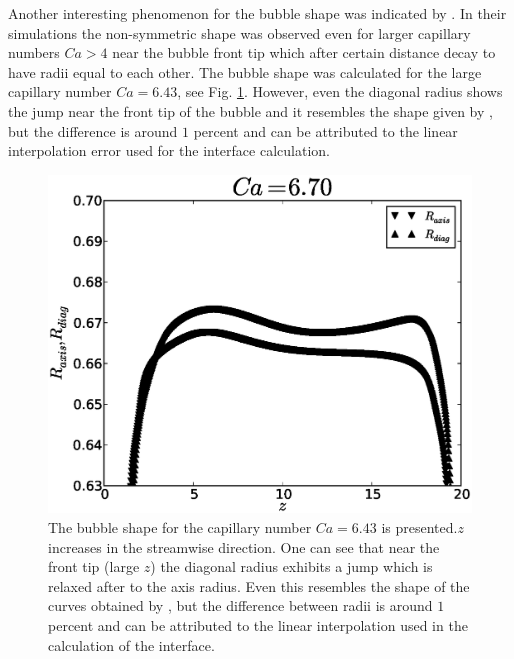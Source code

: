 \documentclass{article}
\begin{document}
Another interesting phenomenon for the bubble shape was indicated by \citet{heil-threedim}. In
their simulations the non-symmetric shape was observed even for larger capillary numbers $Ca>4$ near
the bubble front tip which after certain distance decay to have radii equal to each other. The
bubble shape was calculated for the large capillary number $Ca=6.43$, see Fig.
\ref{fig:bubble:ca:large}. However, even the diagonal radius shows the jump near the front tip of
the bubble and it resembles the shape given by \citet{heil-threedim}, but the difference is around
$1$ percent and can be attributed to the linear interpolation error used for the interface
calculation. 
\begin{figure}[ht]
\includegraphics[width=\textwidth]{Figures/bubble_ca_large.eps}
\caption{The bubble shape for the capillary number $Ca=6.43$ is presented.$z$ increases in the
streamwise direction. One can see that near the front tip (large $z$) the diagonal radius exhibits
a jump which is relaxed after to the axis radius. Even this resembles
the shape of the curves obtained by \citet{heil-threedim}, but the
difference between radii is around $1$ percent and can be attributed to
the linear interpolation used in the calculation of the interface.\label{fig:bubble:ca:large}}
\end{figure}
\end{document}
